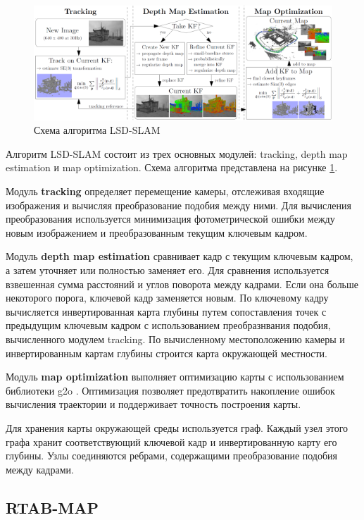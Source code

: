 \documentclass{mipt-thesis-ms}
\begin{document}
	\begin{figure}
		\includegraphics[width=1.0\textwidth]{img/lsd_slam_scheme.png}
		\caption{Схема алгоритма LSD-SLAM}
		\label{figure_lsd_slam}
	\end{figure}
	
	Алгоритм LSD-SLAM состоит из трех основных модулей: tracking, depth map estimation и map optimization. Схема алгоритма представлена на рисунке \ref{figure_lsd_slam}.
	
	Модуль \textbf{tracking} определяет перемещение камеры, отслеживая входящие изображения и вычисляя преобразование подобия между ними. Для вычисления преобразования используется минимизация фотометрической ошибки между новым изображением и преобразованным текущим ключевым кадром.
	
	Модуль \textbf{depth map estimation} сравнивает кадр с текущим ключевым кадром, а затем уточняет или полностью заменяет его. Для сравнения используется взвешенная сумма расстояний и углов поворота между кадрами. Если она больше некоторого порога, ключевой кадр заменяется новым. По ключевому кадру вычисляется инвертированная карта глубины путем сопоставления точек с предыдущим ключевым кадром с использованием преобразнвания подобия, вычисленного модулем tracking. По вычисленному местоположению камеры и инвертированным картам глубины строится карта окружающей местности.
	
	Модуль \textbf{map optimization} выполняет оптимизацию карты с использованием библиотеки g2o \cite{grisetti2011g2o}. Оптимизация позволяет предотвратить накопление ошибок вычисления траектории и поддерживает точность построения карты.
	
	Для хранения карты окружающей среды используется граф. Каждый узел этого графа хранит соответствующий ключевой кадр и инвертированную карту его глубины. Узлы соединяются ребрами, содержащими преобразование подобия между кадрами.
	
	\subsection{RTAB-MAP}
	\label{section_rtabmap}
	
\end{document}
